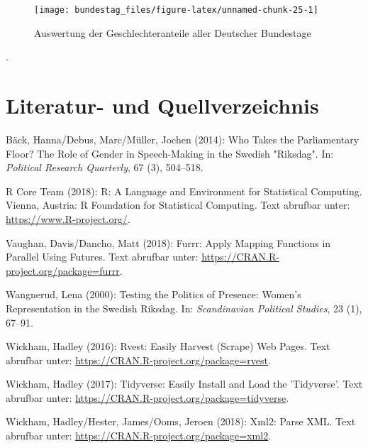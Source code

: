 \documentclass[oneside, 12pt, numbers=endperiod]{scrbook}
\theoremstyle{definition}
\theoremstyle{definition}
\theoremstyle{definition}
\theoremstyle{remark}
\begin{document}
\begin{figure}

{\centering \texttt{[image: bundestag\_files/figure-latex/unnamed-chunk-25-1]} 

}

\caption{Auswertung der Geschlechteranteile aller Deutscher Bundestage}\label{fig:unnamed-chunk-25}
\end{figure}

.

\hypertarget{literatur--und-quellverzeichnis}{%
\chapter*{Literatur- und
Quellverzeichnis}\label{literatur--und-quellverzeichnis}}

\hypertarget{refs}{}
\leavevmode\hypertarget{ref-back_2014}{}%
Bäck, Hanna/Debus, Marc/Müller, Jochen (2014): Who Takes the
Parliamentary Floor? The Role of Gender in Speech-Making in the Swedish
"Riksdag". In: \emph{Political Research Quarterly}, 67 (3), 504--518.

\leavevmode\hypertarget{ref-rcoreteam_2018}{}%
R Core Team (2018): R: A Language and Environment for Statistical
Computing. Vienna, Austria: R Foundation for Statistical Computing. Text
abrufbar unter: \url{https://www.R-project.org/}.

\leavevmode\hypertarget{ref-vaughan_2018}{}%
Vaughan, Davis/Dancho, Matt (2018): Furrr: Apply Mapping Functions in
Parallel Using Futures. Text abrufbar unter:
\url{https://CRAN.R-project.org/package=furrr}.

\leavevmode\hypertarget{ref-wangnerud_2000}{}%
Wangnerud, Lena (2000): Testing the Politics of Presence: Women's
Representation in the Swedish Riksdag. In: \emph{Scandinavian Political
Studies}, 23 (1), 67--91.

\leavevmode\hypertarget{ref-wickham_2016}{}%
Wickham, Hadley (2016): Rvest: Easily Harvest (Scrape) Web Pages. Text
abrufbar unter: \url{https://CRAN.R-project.org/package=rvest}.

\leavevmode\hypertarget{ref-wickham_2017}{}%
Wickham, Hadley (2017): Tidyverse: Easily Install and Load the
'Tidyverse'. Text abrufbar unter:
\url{https://CRAN.R-project.org/package=tidyverse}.

\leavevmode\hypertarget{ref-wickham_2018}{}%
Wickham, Hadley/Hester, James/Ooms, Jeroen (2018): Xml2: Parse XML. Text
abrufbar unter: \url{https://CRAN.R-project.org/package=xml2}.
\end{document}
